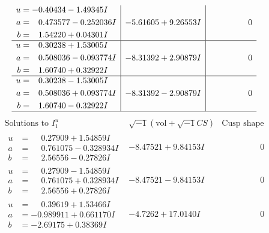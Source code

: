 \documentclass[1p]{elsarticle_modified}
\theoremstyle{definition}
\newcommand{\I}{\sqrt{-1}}
\begin{document}
$$\begin{array}{c|c|c}
\begin{aligned}
u &= -0.40434 - 1.49345 I \\
a &= \phantom{-}0.473577 - 0.252036 I \\
b &= \phantom{-}1.54220 + 0.04301 I\end{aligned}
 & -5.61605 + 9.26553 I & \phantom{-0.000000 } 0 \\ \hline\begin{aligned}
u &= \phantom{-}0.30238 + 1.53005 I \\
a &= \phantom{-}0.508036 - 0.093774 I \\
b &= \phantom{-}1.60740 + 0.32922 I\end{aligned}
 & -8.31392 + 2.90879 I & \phantom{-0.000000 } 0 \\ \hline\begin{aligned}
u &= \phantom{-}0.30238 - 1.53005 I \\
a &= \phantom{-}0.508036 + 0.093774 I \\
b &= \phantom{-}1.60740 - 0.32922 I\end{aligned}
 & -8.31392 - 2.90879 I & \phantom{-0.000000 } 0\\
 \hline 
 \end{array}$$\newpage$$\begin{array}{c|c|c}  
\text{Solutions to }I^u_{1}& \I (\text{vol} + \sqrt{-1}CS) & \text{Cusp shape}\\
 \hline 
\begin{aligned}
u &= \phantom{-}0.27909 + 1.54859 I \\
a &= \phantom{-}0.761075 - 0.328934 I \\
b &= \phantom{-}2.56556 - 0.27826 I\end{aligned}
 & -8.47521 + 9.84153 I & \phantom{-0.000000 } 0 \\ \hline\begin{aligned}
u &= \phantom{-}0.27909 - 1.54859 I \\
a &= \phantom{-}0.761075 + 0.328934 I \\
b &= \phantom{-}2.56556 + 0.27826 I\end{aligned}
 & -8.47521 - 9.84153 I & \phantom{-0.000000 } 0 \\ \hline\begin{aligned}
u &= \phantom{-}0.39619 + 1.53466 I \\
a &= -0.989911 + 0.661170 I \\
b &= -2.69175 + 0.38369 I\end{aligned}
 & -4.7262 + 17.0140 I & \phantom{-0.000000 } 0 \\ \hline\begin{aligned}

\end{aligned}
\end{array}$$
\end{document}
